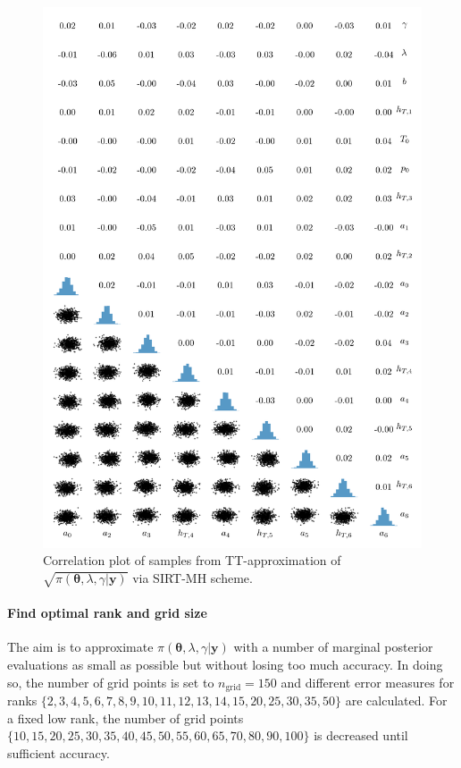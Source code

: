 \begin{figure}%
	\includegraphics[]{2ndCorrPlot.png}
	\caption*{Correlation plot of samples from TT-approximation of $\sqrt{\pi(\bm{\theta},\lambda,\gamma | \bm{y})}$ via SIRT-MH scheme.}
\end{figure}



\paragraph{Find optimal rank and grid size}
The aim is to approximate $\pi( \bm{\theta},\lambda,\gamma  | \bm{y})$ with a number of marginal posterior evaluations as small as possible but without losing too much accuracy.
In doing so, the number of grid points is set to $n_{\text{grid}} = 150$ and different error measures for ranks $\{2,3,4,5,6,7,8,9,10,11,12,13,14,15, 20, 25, 30, 35, 50\}$ are calculated.
For a fixed low rank, the number of grid points \linebreak$\{10, 15, 20, 25, 30, 35, 40, 45, 50, 55, 60, 65, 70, 80, 90, 100\}$ is decreased until sufficient accuracy.

